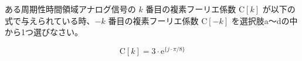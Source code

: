 ある周期性時間領域アナログ信号の $k$ 番目の複素フーリエ係数 $\textrm{C}[k]$ が以下の式で与えられている時、$-k$ 番目の複素フーリエ係数 $\textrm{C}[-k]$ を選択肢a〜dの中から1つ選びなさい。

\[
\textrm{C}[k] = 3 \cdot \textrm{e}^{\{ j \cdot \pi/8 \}}
\]

